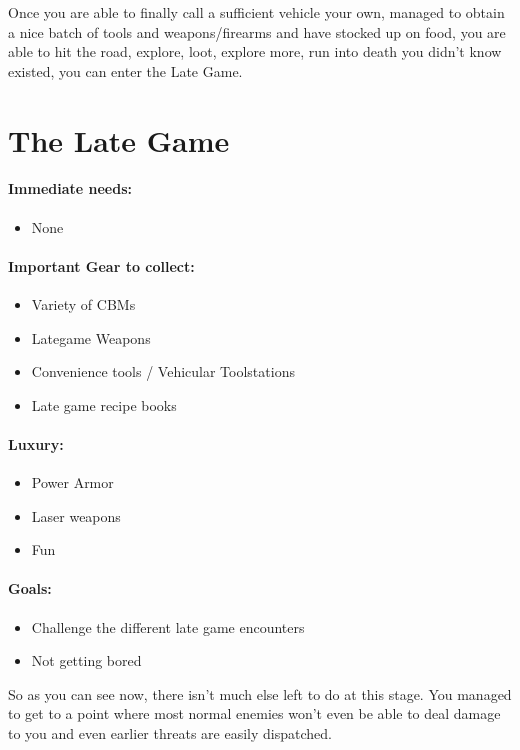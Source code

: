 Once you are able to finally call a sufficient vehicle your own, managed to obtain a nice batch of tools and weapons/firearms and have stocked up on food, you are able to hit the road, explore, loot, explore more, run into death you didn't know existed, you can enter the Late Game.

\section{The Late Game}

\paragraph{Immediate needs:}
\begin{itemize}
\item None
\end{itemize}


\paragraph{Important Gear to collect:}
\begin{itemize}
\item Variety of CBMs
\item Lategame Weapons
\item Convenience tools / Vehicular Toolstations
\item Late game recipe books
\end{itemize}

\paragraph{Luxury:}
\begin{itemize}
\item Power Armor
\item Laser weapons
\item Fun
\end{itemize}

\paragraph{Goals:}
\begin{itemize}
\item Challenge the different late game encounters
\item Not getting bored
\end{itemize}

So as you can see now, there isn't much else left to do at this stage. You managed to get to a point where most normal enemies won't even be able to deal damage to you and even earlier threats are easily dispatched.

